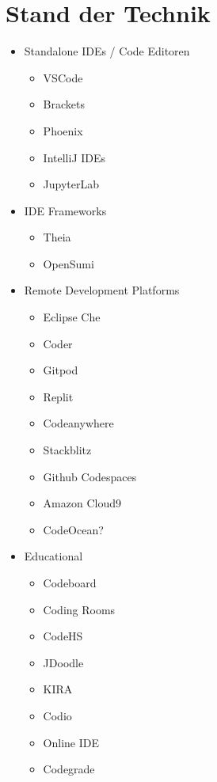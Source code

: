 \chapter{Stand der Technik} \label{stand_der_technik}

\begin{itemize}
    \item Standalone IDEs / Code Editoren
          \begin{itemize}
              \item VSCode
              \item Brackets
              \item Phoenix
              \item IntelliJ IDEs
              \item JupyterLab
          \end{itemize}
    \item IDE Frameworks
          \begin{itemize}
              \item Theia
              \item OpenSumi
          \end{itemize}
    \item Remote Development Platforms
          \begin{itemize}
              \item Eclipse Che
              \item Coder
              \item Gitpod
              \item Replit
              \item Codeanywhere
              \item Stackblitz
              \item Github Codespaces
              \item Amazon Cloud9
              \item CodeOcean?
          \end{itemize}
    \item Educational
          \begin{itemize}
              \item Codeboard
              \item Coding Rooms
              \item CodeHS
              \item JDoodle
              \item KIRA
              \item Codio
              \item Online IDE
              \item Codegrade
          \end{itemize}
\end{itemize}

